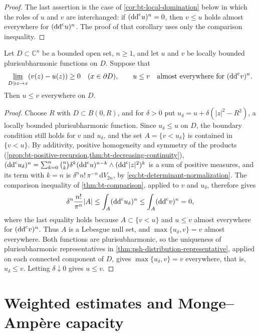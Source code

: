 \begin{proof}
The last assertion is the case of \cref{cor:bt-local-domination} below in which the roles of $u$ and $v$ are interchanged: if $(\mathrm{dd}^{\mathrm{c}} u)^n=0$, then $v\le u$ holds almost everywhere for $(\mathrm{dd}^{\mathrm{c}} u)^n$. The proof of that corollary uses only the comparison inequality.
\end{proof}

\begin{corollary}\label{cor:bt-local-domination}
Let $D\subset\mathbb C^n$ be a bounded open set, $n\geq1$, and let $u$ and $v$ be locally bounded plurisubharmonic functions on $D$. Suppose that
\[
 \varliminf_{D\ni z\to x}(v(z)-u(z))\geq0
       \quad(x\in\partial D),\qquad
 u\leq v\quad\text{almost everywhere for }(\mathrm{dd}^{\mathrm{c}} v)^n.
\]
Then $u\leq v$ everywhere on $D$.
\end{corollary}
\begin{proof}
Choose $R$ with $D\subset B(0,R)$, and for $\delta>0$ put $u_\delta=u+\delta(|z|^2-R^2)$, a locally bounded plurisubharmonic function. Since $u_\delta\le u$ on $D$, the boundary condition still holds for $v$ and $u_\delta$, and the set $A=\{v<u_\delta\}$ is contained in $\{v<u\}$. By additivity, positive homogeneity and symmetry of the products (\cref{prop:bt-positive-recursion,thm:bt-decreasing-continuity}), $(\mathrm{dd}^{\mathrm{c}} u_\delta)^n=\sum_{k=0}^n\binom nk\delta^k(\mathrm{dd}^{\mathrm{c}} u)^{n-k}\wedge(\mathrm{dd}^{\mathrm{c}}|z|^2)^k$ is a sum of positive measures, and its term with $k=n$ is $\delta^nn!\,\pi^{-n}\,\mathrm dV_{2n}$, by \eqref{eq:bt-determinant-normalization}. The comparison inequality of \cref{thm:bt-comparison}, applied to $v$ and $u_\delta$, therefore gives
\[
 \delta^n\frac{n!}{\pi^n}|A|\leq\int_A(\mathrm{dd}^{\mathrm{c}} u_\delta)^n\leq\int_A(\mathrm{dd}^{\mathrm{c}} v)^n=0,
\]
where the last equality holds because $A\subset\{v<u\}$ and $u\le v$ almost everywhere for $(\mathrm{dd}^{\mathrm{c}} v)^n$. Thus $A$ is a Lebesgue null set, and $\max\{u_\delta,v\}=v$ almost everywhere. Both functions are plurisubharmonic, so the uniqueness of plurisubharmonic representatives in \cref{thm:psh-distribution-representative}, applied on each connected component of $D$, gives $\max\{u_\delta,v\}=v$ everywhere, that is, $u_\delta\leq v$. Letting $\delta\downarrow0$ gives $u\le v$.
\end{proof}

\section{Weighted estimates and Monge--Amp\`ere capacity}
\label{sec:bt-capacity}

